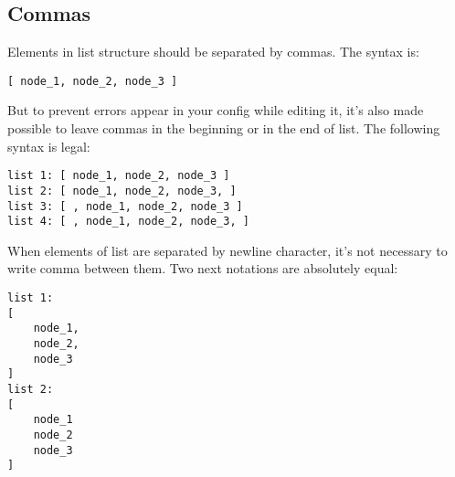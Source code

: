 \subsection{Commas}
Elements in list structure should be separated by commas. The syntax is: 
\begin{lstlisting}[caption = Commas in list (1)]
[ node_1, node_2, node_3 ]
\end{lstlisting}
But to prevent errors appear in your config while editing it, it's also made possible to leave commas in the beginning or in the end  of list. The following syntax is legal:
\begin{lstlisting}[caption = Commas in list (2)]
list 1: [ node_1, node_2, node_3 ]
list 2: [ node_1, node_2, node_3, ]
list 3: [ , node_1, node_2, node_3 ]
list 4: [ , node_1, node_2, node_3, ]
\end{lstlisting}

When elements of list are separated by newline character, it's not necessary to write comma between them. Two next notations are absolutely equal: \\
\begin{minipage}{0.45\textwidth}
\begin{lstlisting}[caption = Commas in list (3)]
list 1:
[
	node_1,
	node_2,
	node_3
]
list 2:
[
	node_1
	node_2
	node_3
]
\end{lstlisting}
\end{minipage}



